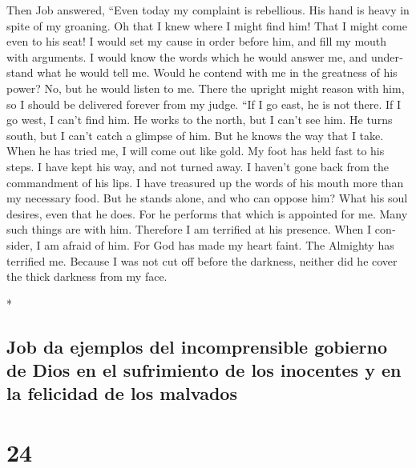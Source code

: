 \begin{paracol}{2}
\begin{otherlanguage}{english}
 Then Job answered,  ``Even today my
complaint is rebellious. His hand is heavy in spite of my groaning.
 Oh that I knew where I might find him! That I might come
even to his seat!  I would set my cause in order before
him, and fill my mouth with arguments.  I would know the
words which he would answer me, and understand what he would tell me.
 Would he contend with me in the greatness of his power?
No, but he would listen to me.  There the upright might
reason with him, so I should be delivered forever from my judge.
 ``If I go east, he is not there. If I go west, I can't
find him.  He works to the north, but I can't see him. He
turns south, but I can't catch a glimpse of him.  But he
knows the way that I take. When he has tried me, I will come out like
gold.  My foot has held fast to his steps. I have kept
his way, and not turned away.  I haven't gone back from
the commandment of his lips. I have treasured up the words of his mouth
more than my necessary food.  But he stands alone, and
who can oppose him? What his soul desires, even that he does.
 For he performs that which is appointed for me. Many
such things are with him.  Therefore I am terrified at
his presence. When I consider, I am afraid of him.  For
God has made my heart faint. The Almighty has terrified me.
 Because I was not cut off before the darkness, neither
did he cover the thick darkness from my face.

\end{otherlanguage}

\switchcolumn[0]*

\hypertarget{job-da-ejemplos-del-incomprensible-gobierno-de-dios-en-el-sufrimiento-de-los-inocentes-y-en-la-felicidad-de-los-malvados}{%
\subsection{Job da ejemplos del incomprensible gobierno de Dios en el
sufrimiento de los inocentes y en la felicidad de los
malvados}\label{job-da-ejemplos-del-incomprensible-gobierno-de-dios-en-el-sufrimiento-de-los-inocentes-y-en-la-felicidad-de-los-malvados}}

\hypertarget{section-46}{%
\section{24}\label{section-46}}


\end{paracol}
